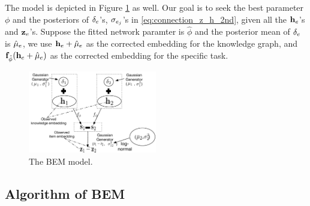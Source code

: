 The model is depicted in Figure \ref{fig:generation_model} as well. Our goal is to seek the best parameter $\phi$ and the posteriors of ${\mathbf \delta}_e$'s, ${\mathbf \sigma}_{e_j}$'s in \eqref{eq:connection_z_h_2nd}, given all the ${\mathbf h}_e$'s and ${\mathbf z}_e$'s. Suppose the fitted network paramter is $\hat{\phi}$ and the posterior mean of ${\mathbf \delta}_e$ is $\hat{{\mathbf \mu}}_{e}$, we use ${\mathbf h}_e +\hat{{\mathbf \mu}}_{e}$ as the corrected embedding for the knowledge graph, and ${\mathbf f}_{\hat{\phi}}({\mathbf h}_e +\hat{{\mathbf \mu}}_{e})$ as the corrected embedding for the specific task.

\begin{figure}[h]
  \centering
  \includegraphics[width=0.5\textwidth]{./fig/generation.pdf}
  \caption{The BEM model.}
  \label{fig:generation_model}
\end{figure}
\subsection{Algorithm of BEM}

